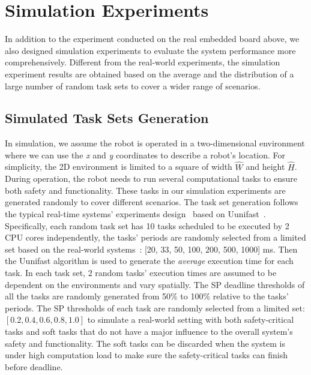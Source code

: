     \section{Simulation Experiments}
    \label{section: simulation}
    In addition to the experiment conducted on the real embedded board above, we also designed simulation experiments to evaluate the system performance more comprehensively. Different from the real-world experiments, the simulation experiment results are obtained based on the average and the distribution of a large number of random task sets to cover a wider range of scenarios.
    
    \subsection{Simulated Task Sets Generation}


    In simulation, we assume the robot is operated in a two-dimensional environment where we can use the \textit{x} and \textit{y} coordinates to describe a robot's location. 
    For simplicity, the 2D environment is limited to a square of width $\hat{W}$ and height $\hat{H}$.
    During operation, the robot needs to run several computational tasks to ensure both safety and functionality. These tasks in our simulation experiments are generated randomly to cover different scenarios. The task set generation follows the typical real-time systems' experiments design~\cite{Wang2023RTAS, Zhao2020AnOF} based on Uunifast~\cite{Davis2008EfficientES}.
    Specifically, each random task set has 10 tasks scheduled to be executed by 2 CPU cores independently, the tasks' periods are randomly selected from a limited set based on the real-world systems~\cite{Percept21_RTSS, Kramer15benchmark}: [20, 33, 50, 100, 200, 500, 1000] ms. Then the Uunifast algorithm is used to generate the \textit{average} execution time for each task. 
    In each task set, 2 random tasks' execution times are assumed to be dependent on the environments and vary spatially. The SP deadline thresholds of all the tasks are randomly generated from 50\% to 100\% relative to the tasks' periods. The SP thresholds of each task are randomly selected from a limited set: $[0.2, 0.4, 0.6, 0.8, 1.0]$ to simulate a real-world setting with both safety-critical tasks and soft tasks that do not have a major influence to the overall system's safety and functionality. The soft tasks can be discarded when the system is under high computation load to make sure the safety-critical tasks can finish before deadline. 

